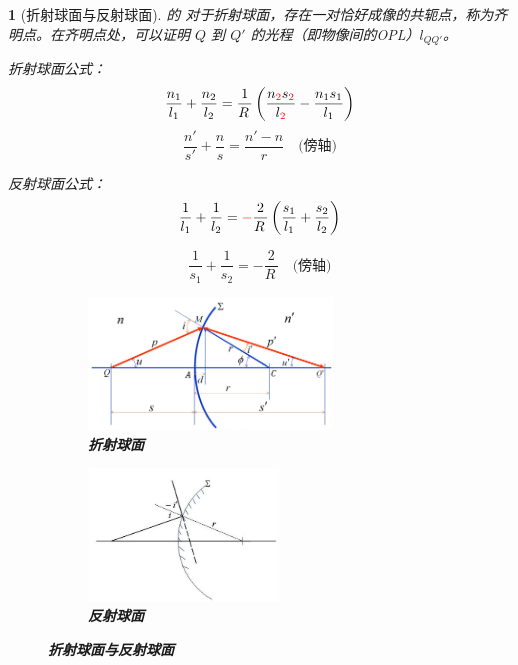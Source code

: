 \documentclass[UTF8]{report}
\theoremstyle{MyLineTheoremStyle} %
\theoremstyle{MyBlockTheoremStyle} %
\theoremstyle{MySubsubsectionStyle} %
\newtheorem{definition}{}
\begin{document}
\begin{definition}[折射球面与反射球面]
的
对于折射球面，存在一对恰好成像的共轭点，称为齐明点。在齐明点处，可以证明 $Q$ 到 $Q'$ 的光程（即物像间的OPL）$l_{QQ'}$。

折射球面公式：
\begin{gather}
\frac{n_1}{l_1} + \frac{n_2}{l_2} = \frac{1}{R\,}\left( \frac{n_{{\color{red} 2}}s_{{\color{red} 2}}}{l_{{\color{red} 2}}} - \frac{n_1s_1}{l_1} \right)
\end{gather}
{\color{gray}\small
\begin{equation}
    \frac{n'}{s'}  +  \frac{n}{s} = \frac{n'-n}{r}\quad  \text{(傍轴)}
\end{equation}
}

反射球面公式：
\begin{equation}
\frac{1}{l_1} + \frac{1}{l_2} = {\color{red} -}\frac{2}{R\,}\left(\frac{s_1}{l_1} + \frac{s_2}{l_2}  \right)
\end{equation}
{\par\color{gray}\small
\begin{equation}
 \frac{1}{s_1} + \frac{1}{s_2} = -\frac{2}{R\,} \quad  \text{(傍轴)}
\end{equation}
\par}

\begin{figure}[H]\centering
\begin{subfigure}[t]{0.45\textwidth}\centering
    \includegraphics[height=100pt]{assets/image.jpg}
    \caption{\bfseries 折射球面 }
\end{subfigure}\begin{subfigure}[t]{0.4\textwidth}\centering
    \includegraphics[height=100pt]{assets/image (1).jpg}
    \caption{\bfseries 反射球面 }
\end{subfigure}
\caption{\bfseries 折射球面与反射球面 }
\end{figure}

\end{definition}
\end{document}
